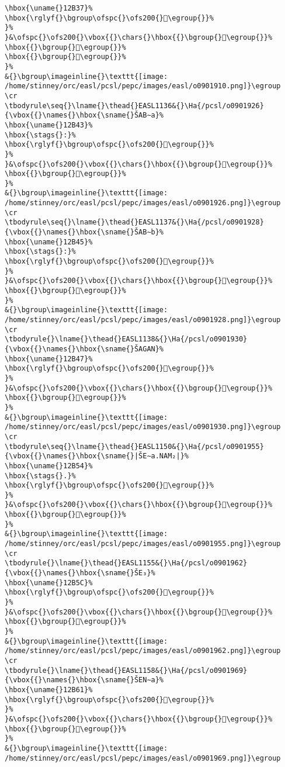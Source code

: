 \begin{verbatim}
\hbox{\uname{}12B37}%
\hbox{\rglyf{}\bgroup\ofspc{}\ofs200{}𒬷\egroup{}}%
}%
}&\ofspc{}\ofs200{}\vbox{{}\chars{}\hbox{{}\bgroup{}𒬻\egroup{}}%
\hbox{{}\bgroup{}𒬼\egroup{}}%
\hbox{{}\bgroup{}𒬷\egroup{}}%
}%
&{}\bgroup\imageinline{}\texttt{[image: /home/stinney/orc/easl/pcsl/pepc/images/easl/o0901910.png]}\egroup
\cr
\tbodyrule\seq{}\lname{}\thead{}EASL1136&{}\Ha{/pcsl/o0901926}{\vbox{{}\names{}\hbox{\sname{}ŠAB∼a}%
\hbox{\uname{}12B43}%
\hbox{\stags{}:}%
\hbox{\rglyf{}\bgroup\ofspc{}\ofs200{}𒭃\egroup{}}%
}%
}&\ofspc{}\ofs200{}\vbox{{}\chars{}\hbox{{}\bgroup{}𒭂\egroup{}}%
\hbox{{}\bgroup{}𒭃\egroup{}}%
}%
&{}\bgroup\imageinline{}\texttt{[image: /home/stinney/orc/easl/pcsl/pepc/images/easl/o0901926.png]}\egroup
\cr
\tbodyrule\seq{}\lname{}\thead{}EASL1137&{}\Ha{/pcsl/o0901928}{\vbox{{}\names{}\hbox{\sname{}ŠAB∼b}%
\hbox{\uname{}12B45}%
\hbox{\stags{}:}%
\hbox{\rglyf{}\bgroup\ofspc{}\ofs200{}𒭅\egroup{}}%
}%
}&\ofspc{}\ofs200{}\vbox{{}\chars{}\hbox{{}\bgroup{}𒭄\egroup{}}%
\hbox{{}\bgroup{}𒭅\egroup{}}%
}%
&{}\bgroup\imageinline{}\texttt{[image: /home/stinney/orc/easl/pcsl/pepc/images/easl/o0901928.png]}\egroup
\cr
\tbodyrule{}\lname{}\thead{}EASL1138&{}\Ha{/pcsl/o0901930}{\vbox{{}\names{}\hbox{\sname{}ŠAGAN}%
\hbox{\uname{}12B47}%
\hbox{\rglyf{}\bgroup\ofspc{}\ofs200{}𒭇\egroup{}}%
}%
}&\ofspc{}\ofs200{}\vbox{{}\chars{}\hbox{{}\bgroup{}𒭆\egroup{}}%
\hbox{{}\bgroup{}𒭇\egroup{}}%
}%
&{}\bgroup\imageinline{}\texttt{[image: /home/stinney/orc/easl/pcsl/pepc/images/easl/o0901930.png]}\egroup
\cr
\tbodyrule\seq{}\lname{}\thead{}EASL1150&{}\Ha{/pcsl/o0901955}{\vbox{{}\names{}\hbox{\sname{}|ŠE∼a.NAM₂|}%
\hbox{\uname{}12B54}%
\hbox{\stags{}.}%
\hbox{\rglyf{}\bgroup\ofspc{}\ofs200{}𒭔\egroup{}}%
}%
}&\ofspc{}\ofs200{}\vbox{{}\chars{}\hbox{{}\bgroup{}𒭔\egroup{}}%
\hbox{{}\bgroup{}𒭕\egroup{}}%
}%
&{}\bgroup\imageinline{}\texttt{[image: /home/stinney/orc/easl/pcsl/pepc/images/easl/o0901955.png]}\egroup
\cr
\tbodyrule{}\lname{}\thead{}EASL1155&{}\Ha{/pcsl/o0901962}{\vbox{{}\names{}\hbox{\sname{}ŠE₃}%
\hbox{\uname{}12B5C}%
\hbox{\rglyf{}\bgroup\ofspc{}\ofs200{}𒭜\egroup{}}%
}%
}&\ofspc{}\ofs200{}\vbox{{}\chars{}\hbox{{}\bgroup{}𒭚\egroup{}}%
\hbox{{}\bgroup{}𒭜\egroup{}}%
}%
&{}\bgroup\imageinline{}\texttt{[image: /home/stinney/orc/easl/pcsl/pepc/images/easl/o0901962.png]}\egroup
\cr
\tbodyrule{}\lname{}\thead{}EASL1158&{}\Ha{/pcsl/o0901969}{\vbox{{}\names{}\hbox{\sname{}ŠEN∼a}%
\hbox{\uname{}12B61}%
\hbox{\rglyf{}\bgroup\ofspc{}\ofs200{}𒭡\egroup{}}%
}%
}&\ofspc{}\ofs200{}\vbox{{}\chars{}\hbox{{}\bgroup{}𒭠\egroup{}}%
\hbox{{}\bgroup{}𒭡\egroup{}}%
}%
&{}\bgroup\imageinline{}\texttt{[image: /home/stinney/orc/easl/pcsl/pepc/images/easl/o0901969.png]}\egroup

\end{verbatim}
